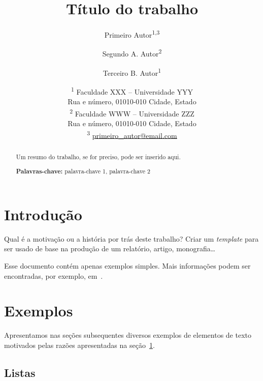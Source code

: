 \documentclass[a4paper,11pt]{article}
\begin{document}
\title{Título do trabalho}

\author{Primeiro Autor\textsuperscript{1,3}
\and Segundo A. Autor\textsuperscript{2}
\and Terceiro B. Autor\textsuperscript{1}}

\date{%
\textsuperscript{1} Faculdade XXX -- Universidade YYY\\
Rua e número, 01010-010 Cidade, Estado\\[1.6ex]
\textsuperscript{2} Faculdade WWW -- Universidade ZZZ\\
Rua e número, 01010-010 Cidade, Estado\\[1.6ex]
\textsuperscript{3} \href{mailto:primeiro_autor@email.com}{primeiro\_autor@email.com}}

\maketitle


\begin{abstract}

Um resumo do trabalho, se for preciso, pode ser inserido aqui.

{\bf\footnotesize Palavras-chave:} palavra-chave 1, palavra-chave 2

\end{abstract}


\tableofcontents


\section{Introdução}
\label{sec:intro}

Qual é a motivação ou a história por trás deste trabalho?
Criar um \emph{template} para ser usado de base na produção de um relatório, artigo, monografia\dots

Esse documento contém apenas exemplos simples.
Mais informações podem ser encontradas, por exemplo, em~\cite{oetiker_not_2015,latex_wikibook}.

\section{Exemplos}

Apresentamos nas seções subsequentes diversos exemplos de elementos de texto motivados pelas razões apresentadas na seção~\ref{sec:intro}.

\subsection{Listas}
\end{document}
